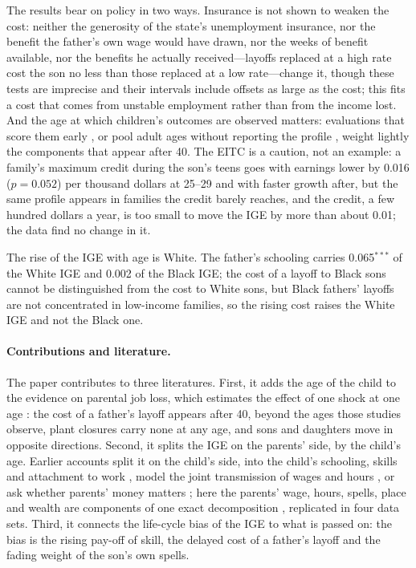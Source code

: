 The results bear on policy in two ways. Insurance is not shown to weaken the cost: neither the generosity of the state's
unemployment insurance, nor the benefit the father's own wage would have drawn, nor the weeks of benefit available,
nor the benefits he actually received---layoffs replaced at a high rate cost the son no less than those replaced at a
low rate---change it, though these tests are imprecise and their intervals include offsets as large as the cost; this fits a cost that comes from
unstable employment rather than from the income lost. And the age at which children's outcomes are observed matters:
evaluations that score them early \citep{bastian2018long, chetty2016effects}, or pool adult ages without reporting the profile
\citep{hoynes2016long, jackson2016effects}, weight lightly the components that appear after 40. The EITC is a caution, not an example: a family's maximum credit during the son's teens goes with
earnings lower by 0.016 ($p = 0.052$) per thousand dollars at 25--29 and with faster growth after, but the same profile
appears in families the credit barely reaches, and the credit, a few hundred dollars a year, is too small to move the
IGE by more than about 0.01; the data find no change in it.

The rise of the IGE with age is White. The father's schooling carries 0.065$^{***}$ of the White IGE and 0.002 of the
Black IGE; the cost of a layoff to Black sons cannot be distinguished from the cost to White sons, but Black fathers'
layoffs are not concentrated in low-income families, so the rising cost raises the White IGE and not the Black one.

\paragraph{Contributions and literature.} The paper contributes to three literatures. First, it adds the age of the
child to the evidence on parental job loss, which estimates the effect of one shock at one age
\citep{oreopoulos2008intergenerational, hilger2016parental, kalil2011parental}: the cost of a father's layoff appears
after 40, beyond the ages those studies observe, plant closures carry none at any age, and sons and daughters move in
opposite directions. Second, it splits the IGE on the parents' side, by the child's age. Earlier accounts split it on the
child's side, into the child's schooling, skills and attachment to work \citep{blanden2007accounting,
gregg2019intergenerational, rothstein2019inequality}, model the joint transmission of wages and hours
\citep{altonji2000intergenerational}, or ask whether parents' money matters \citep{shea2000does,
cardak2013intergenerational, black2005why}; here the parents' wage, hours, spells, place and wealth are components of one
exact decomposition \citep{gelbach2016covariates}, replicated in four data sets. Third, it connects the life-cycle bias
of the IGE \citep{haider2006life, grawe2006lifecycle, nybom2016heterogeneous, nybom2017biases, chetty2014where} to what
is passed on: the bias is the rising pay-off of skill, the delayed cost of a father's layoff and the fading weight of the
son's own spells.

